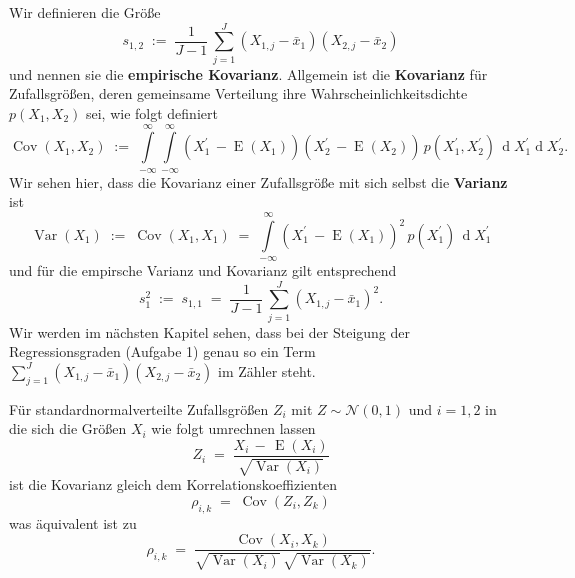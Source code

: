Wir definieren die Größe
\begin{equation}
s_{1,2} \; := \; \frac{1}{J-1} \, \sum_{j = 1}^J (X_{1,j} - \bar x_1)(X_{2,j} - \bar x_2)
\end{equation}
und nennen sie die \textbf{empirische Kovarianz}.
Allgemein ist die \textbf{Kovarianz} für Zufallsgrößen, deren gemeinsame Verteilung
ihre Wahrscheinlichkeitsdichte $p(X_1, X_2)$ sei, wie folgt definiert
\begin{equation}
\operatorname{Cov}(X_1, X_2) \; := \; 
\int\limits_{-\infty}^{\infty}\int\limits_{-\infty}^{\infty}
(X_1^\prime \, - \operatorname{E}(X_1))(X_2^\prime \, - \operatorname{E}(X_2)) \,
p(X_1^\prime, X_2^\prime) \, \operatorname{d} X_1^\prime \operatorname{d} X_2^\prime .
\end{equation}
Wir sehen hier, dass die Kovarianz einer Zufallsgröße mit sich selbst die
\textbf{Varianz} ist
\begin{equation}
\operatorname{Var}(X_1) \; := \;  \operatorname{Cov}(X_1, X_1) \; = \; 
\int\limits_{-\infty}^{\infty}
(X_1^\prime \, - \operatorname{E}(X_1))^2 \,
p(X_1^\prime) \, \operatorname{d} X_1^\prime
\end{equation}
und für die empirsche Varianz und Kovarianz gilt entsprechend
\begin{equation}
s_{1}^2 \; := \; s_{1,1} \; = \; 
\frac{1}{J-1} \, \sum_{j = 1}^J (X_{1,j} - \bar x_1)^2 .
\end{equation}
Wir werden im nächsten Kapitel sehen, dass bei der Steigung der Regressionsgraden
(Aufgabe 1) genau so ein Term $\sum_{j = 1}^J (X_{1,j} - \bar x_1)(X_{2,j} - \bar x_2)$
im Zähler steht.

Für standardnormalverteilte Zufallsgrößen $Z_i$ mit $Z \sim \mathcal{N}(0,1)$ 
und $i = 1,2$ in die sich
die Größen $X_i$ wie folgt umrechnen lassen
\begin{equation}
Z_i \; = \; \frac{X_i \, - \, \operatorname{E}(X_i)}{\sqrt{\operatorname {Var}(X_{i})}}
\end{equation}
ist die Kovarianz gleich dem Korrelationskoeffizienten
\begin{equation}
\rho_{i,k} \; = \; \operatorname {Cov}(Z_{i},Z_{k})
\end{equation}
was äquivalent ist zu
\begin{equation}
\rho_{i,k} \; = \; \frac{\operatorname {Cov}(X_{i},X_{k})}{\sqrt{\operatorname {Var}(X_{i})} \, \sqrt{\operatorname {Var}(X_{k})}} .
\label{KorrelationskoeffizientKap1}
\end{equation}


